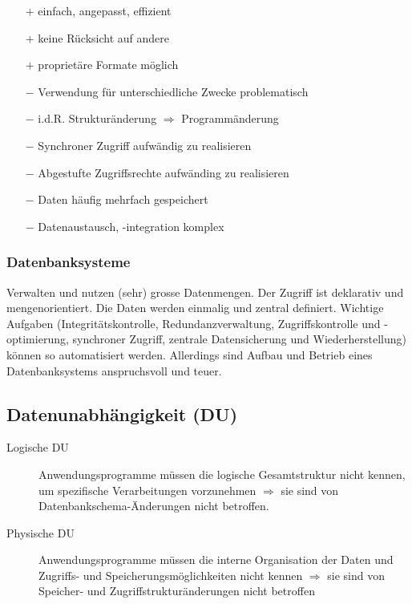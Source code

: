 		\begin{itemize}
			\item [$+$] einfach, angepasst, effizient
			\item [$+$] keine Rücksicht auf andere
			\item [$+$] proprietäre Formate möglich
			\item [$-$] Verwendung für unterschiedliche Zwecke problematisch
			\item [$-$] i.d.R. Strukturänderung $\Rightarrow$ Programmänderung 
			\item [$-$] Synchroner Zugriff aufwändig zu realisieren
			\item [$-$] Abgestufte Zugriffsrechte aufwänding zu realisieren
			\item [$-$] Daten häufig mehrfach gespeichert
			\item [$-$] Datenaustausch, -integration komplex
		\end{itemize}

\subsubsection{Datenbanksysteme}
Verwalten und nutzen (sehr) grosse Datenmengen. Der Zugriff ist deklarativ und mengenorientiert.
Die Daten werden einmalig und zentral definiert. Wichtige Aufgaben (Integritätskontrolle, Redundanzverwaltung,
Zugriffskontrolle und -optimierung, synchroner Zugriff, zentrale Datensicherung und Wiederherstellung) 
können so automatisiert werden. Allerdings sind Aufbau und Betrieb eines Datenbanksystems anspruchsvoll und teuer.


\subsection{Datenunabhängigkeit (DU)}
\begin{description}
	\item [Logische DU] Anwendungsprogramme müssen die logische Gesamtstruktur nicht kennen,
	um spezifische Verarbeitungen vorzunehmen $\Rightarrow$ sie sind von Datenbankschema-Änderungen
	nicht betroffen.
	\item [Physische DU] Anwendungsprogramme müssen die interne Organisation der Daten und Zugriffs- 
	und Speicherungsmöglichkeiten nicht kennen $\Rightarrow$ sie sind von Speicher- und Zugriffstrukturänderungen
	nicht betroffen
\end{description}

